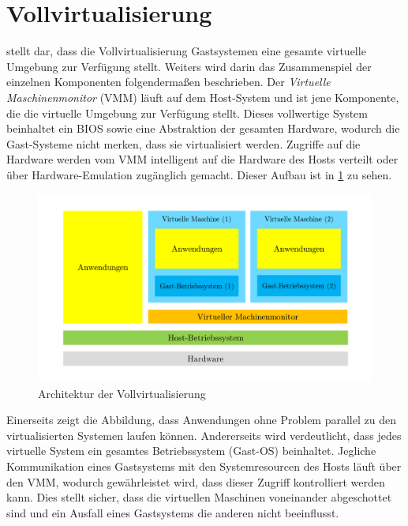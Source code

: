 \section{Vollvirtualisierung}
\label{sec:vollvirtualisierung}
\autocite{Baun2009} stellt dar, dass die Vollvirtualisierung Gastsystemen eine gesamte virtuelle Umgebung zur Verfügung stellt.
Weiters wird darin das Zusammenspiel der einzelnen Komponenten folgendermaßen beschrieben.
Der \emph{Virtuelle Maschinenmonitor} (VMM) läuft auf dem Host-System und ist jene Komponente, die die virtuelle Umgebung zur Verfügung stellt.
Dieses vollwertige System beinhaltet ein BIOS sowie eine Abstraktion der gesamten Hardware, wodurch die Gast-Systeme nicht merken, dass sie virtualisiert werden.
Zugriffe auf die Hardware werden vom VMM intelligent auf die Hardware des Hosts verteilt oder über Hardware-Emulation zugänglich gemacht.
Dieser Aufbau ist in \cref{fig:architektur-vollvirtualisierung} zu sehen.
\begin{figure}[htbp]
    \centering
    \includegraphics[width=0.9\linewidth,clip]{images/vollvirtualisierung}
    \caption{Architektur der Vollvirtualisierung}
\label{fig:architektur-vollvirtualisierung}
\end{figure}
Einerseits zeigt die Abbildung, dass Anwendungen ohne Problem parallel zu den virtualisierten Systemen laufen können.
Andererseits wird verdeutlicht, dass jedes virtuelle System ein gesamtes Betriebssystem (Gast-OS) beinhaltet.
Jegliche Kommunikation eines Gastsystems mit den Systemresourcen des Hosts läuft über den VMM, wodurch gewährleistet wird, dass dieser Zugriff kontrolliert werden kann.
Dies stellt sicher, dass die virtuellen Maschinen voneinander abgeschottet sind und ein Ausfall eines Gastsystems die anderen nicht beeinflusst.

